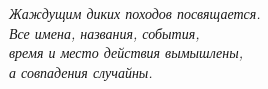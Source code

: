 \chapter*{}
\begin{flushright}
\vspace{2.0cm}
\textit{ \large {
Жаждущим диких походов посвящается.\\
\vspace{\fill}
Все имена, названия, события,\\
время и место действия вымышлены,\\
а совпадения случайны.
}}
\end{flushright}



